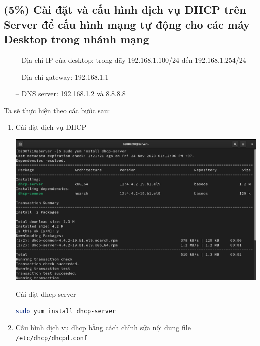 \documentclass[a4paper, 11pt]{article}
\begin{document}
\subsection{(5\%) Cài đặt và cấu hình dịch vụ DHCP trên Server để cấu hình mạng tự động cho các máy Desktop trong nhánh mạng}

\begin{itemize}
    \item[--] Địa chỉ IP của desktop: trong dãy 192.168.1.100/24 đến 192.168.1.254/24
    \item[--] Địa chỉ gateway:  192.168.1.1
    \item[--] DNS server: 192.168.1.2 và 8.8.8.8
\end{itemize}

Ta sẽ thực hiện theo các bước sau:
\begin{enumerate}
    \item Cài đặt dịch vụ DHCP \hfill \\
          \begin{minipage}
              {\linewidth}
              \captionsetup{type=figure}
              \centering
              \includegraphics[width=\linewidth]{images/install-dhcp-server.png}
              \caption{Cài đặt dhcp-server}
              \label{figure:install-dhcp-server}
          \end{minipage}
          \begin{lstlisting}[language=bash, caption=Cài đặt dịch vụ DHCP]
sudo yum install dhcp-server
\end{lstlisting}
    \item Cấu hình dịch vụ dhcp bằng cách chỉnh sửa nội dung file \texttt{/etc/dhcp/dhcpd.conf} \hfill \\
          \begin{minipage}
              {\linewidth}

\end{minipage}
\end{enumerate}
\end{document}
